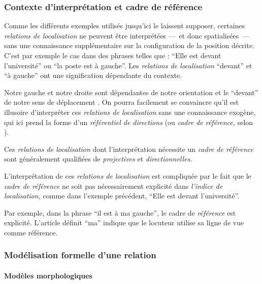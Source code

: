 \subsubsection{Contexte d'interprétation et cadre de référence}



Comme les différents exemples utilisés jusqu'ici le laissent supposer,
certaines \emph{relations de localisation} ne peuvent être
interprétées ---~et donc spatialisées~--- sans une connaissance
supplémentaire sur la configuration de la position décrite. C'est par
exemple le cas dans des phrases telles que : \enquote{Elle est devant
  l'université} ou \enquote{la poste est à gauche}. Les
\emph{relations de localisation} \enquote{devant} et \enquote{à
  gauche} ont une signification dépendante du contexte.

Notre gauche
et notre droite sont dépendantes de notre orientation et le
\enquote{devant} de notre sens de déplacement
\autocite{Vandeloise1986}. On pourra facilement se convaincre qu'il
est illusoire d'interpréter ces \emph{relations de localisation} sans
une connaissance exogène, qui ici prend la forme d'un
\emph{référentiel de directions} (ou \emph{cadre de référence,} selon
\cite{Clementini2013}).

Ces \emph{relations de localisation} dont l'interprétation nécessite
un \emph{cadre de référence} sont généralement qualifiées de
\emph{projectives} et \emph{directionnelles}.

L'interprétation de ces \emph{relations de localisation} est
compliquée par le fait que le \emph{cadre de référence} ne soit pas
nécessairement explicité dans \emph{l'indice de localisation,} comme
dans l'exemple précédent, \enquote{Elle est devant l'université}.

Par exemple, dans la phrase \enquote{il est à ma gauche}, le cadre de
\emph{référence} est explicité. L'article définit \enquote{ma} indique
que le locuteur utilise sa ligne de vue comme référence.

\subsubsection{Modélisation formelle d'une relation}

\paragraph{Modèles morphologiques}



